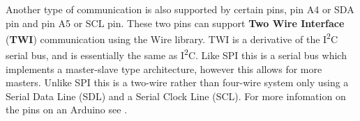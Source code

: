 Another type of communication is also supported by certain pins, pin A4 or SDA pin and pin A5 or SCL pin.
These two pins can support \textbf{Two Wire Interface} (\textbf{TWI}) communication using the Wire library. %
TWI is a derivative of the I\textsuperscript{2}C serial bus, and is essentially the same as I\textsuperscript{2}C.
Like SPI this is a serial bus which implements a master-slave type architecture, however this allows for more masters.
Unlike SPI this is a two-wire rather than four-wire system only using a Serial Data Line (SDL) and a Serial Clock Line (SCL).
For more infomation on the pins on an Arduino see \cite{ArduinoUNO}.